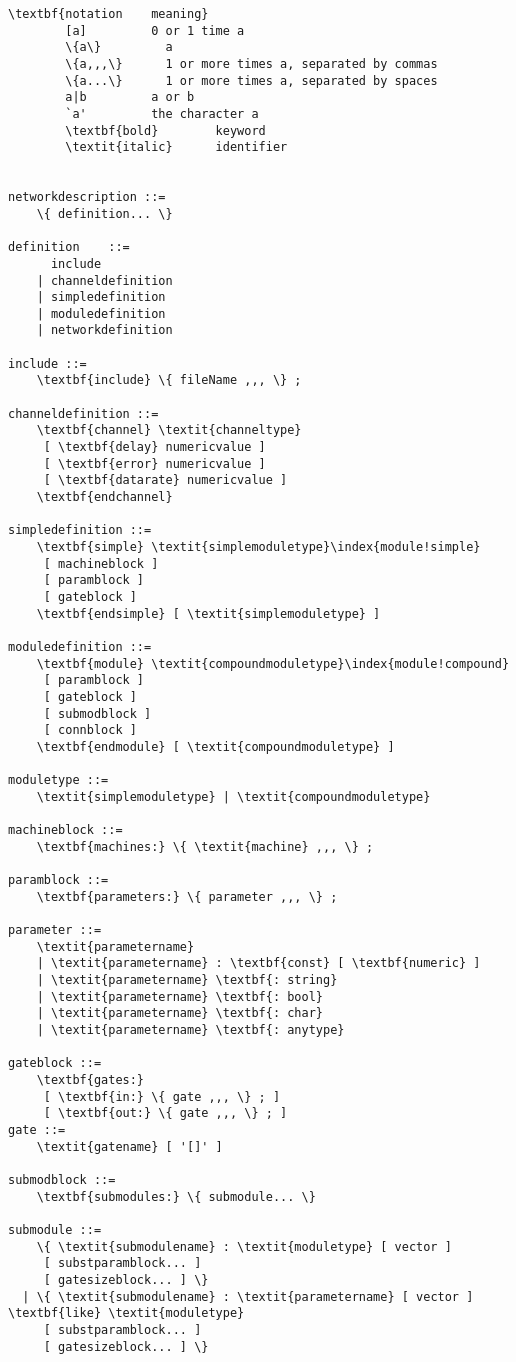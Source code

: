 \begin{Verbatim}[commandchars=\\\{\}]
        \textbf{notation    meaning}
        [a]         0 or 1 time a
        \{a\}         a
        \{a,,,\}      1 or more times a, separated by commas
        \{a...\}      1 or more times a, separated by spaces
        a|b         a or b
        `a'         the character a
        \textbf{bold}        keyword
        \textit{italic}      identifier


networkdescription ::=
    \{ definition... \}

definition    ::=
      include
    | channeldefinition
    | simpledefinition
    | moduledefinition
    | networkdefinition

include ::=
    \textbf{include} \{ fileName ,,, \} ;

channeldefinition ::=
    \textbf{channel} \textit{channeltype}
     [ \textbf{delay} numericvalue ]
     [ \textbf{error} numericvalue ]
     [ \textbf{datarate} numericvalue ]
    \textbf{endchannel}

simpledefinition ::=
    \textbf{simple} \textit{simplemoduletype}\index{module!simple}
     [ machineblock ]
     [ paramblock ]
     [ gateblock ]
    \textbf{endsimple} [ \textit{simplemoduletype} ]

moduledefinition ::=
    \textbf{module} \textit{compoundmoduletype}\index{module!compound}
     [ paramblock ]
     [ gateblock ]
     [ submodblock ]
     [ connblock ]
    \textbf{endmodule} [ \textit{compoundmoduletype} ]

moduletype ::=
    \textit{simplemoduletype} | \textit{compoundmoduletype}

machineblock ::=
    \textbf{machines:} \{ \textit{machine} ,,, \} ;

paramblock ::=
    \textbf{parameters:} \{ parameter ,,, \} ;

parameter ::=
    \textit{parametername}
    | \textit{parametername} : \textbf{const} [ \textbf{numeric} ]
    | \textit{parametername} \textbf{: string}
    | \textit{parametername} \textbf{: bool}
    | \textit{parametername} \textbf{: char}
    | \textit{parametername} \textbf{: anytype}

gateblock ::=
    \textbf{gates:}
     [ \textbf{in:} \{ gate ,,, \} ; ]
     [ \textbf{out:} \{ gate ,,, \} ; ]
gate ::=
    \textit{gatename} [ '[]' ]

submodblock ::=
    \textbf{submodules:} \{ submodule... \}

submodule ::=
    \{ \textit{submodulename} : \textit{moduletype} [ vector ]
     [ substparamblock... ]
     [ gatesizeblock... ] \}
  | \{ \textit{submodulename} : \textit{parametername} [ vector ] \textbf{like} \textit{moduletype}
     [ substparamblock... ]
     [ gatesizeblock... ] \}


\end{Verbatim}
